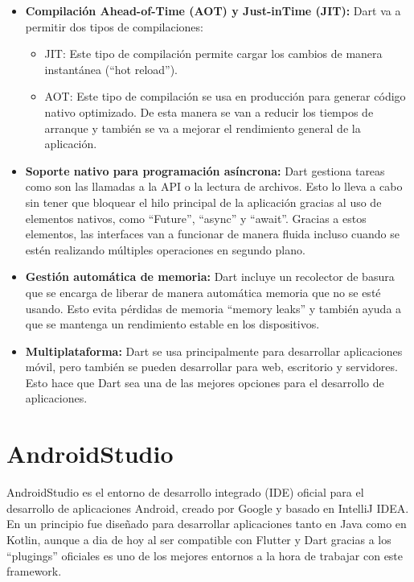 \begin{itemize}
    \item \textbf{Compilación Ahead-of-Time (AOT) y Just-inTime (JIT):} Dart va a permitir dos tipos de compilaciones:
    \begin{itemize}
        \item {JIT:} Este tipo de compilación permite cargar los cambios de manera instantánea (``hot reload''). 
        \item {AOT:} Este tipo de compilación se usa en producción para generar código nativo optimizado. De esta manera se van a reducir los tiempos de arranque y también se va a mejorar el rendimiento general de la aplicación.
    \end{itemize}

    \item \textbf{Soporte nativo para programación asíncrona:} Dart gestiona tareas como son las llamadas a la API o la lectura de archivos. Esto lo lleva a cabo sin tener que bloquear el hilo principal de la aplicación gracias al uso de elementos nativos, como ``Future'', ``async'' y ``await''. Gracias a estos elementos, las interfaces van a funcionar de manera fluida incluso cuando se estén realizando múltiples operaciones en segundo plano.

    \item \textbf{Gestión automática de memoria:} Dart incluye un recolector de basura que se encarga de liberar de manera automática memoria que no se esté usando. Esto evita pérdidas de memoria ``memory leaks'' y también ayuda a que se mantenga un rendimiento estable en los dispositivos.

    \item \textbf{Multiplataforma:} Dart se usa principalmente para desarrollar aplicaciones móvil, pero también se pueden desarrollar para web, escritorio y servidores. Esto hace que Dart sea una de las mejores opciones para el desarrollo de aplicaciones.
\end{itemize}

\section{AndroidStudio}
AndroidStudio es el entorno de desarrollo integrado (IDE) oficial para el desarrollo de aplicaciones Android, creado por Google y basado en IntelliJ IDEA. En un principio fue diseñado para desarrollar aplicaciones tanto en Java como en Kotlin, aunque a dia de hoy al ser compatible con Flutter y Dart gracias a los ``plugings'' oficiales es uno de los mejores entornos a la hora de trabajar con este framework.

